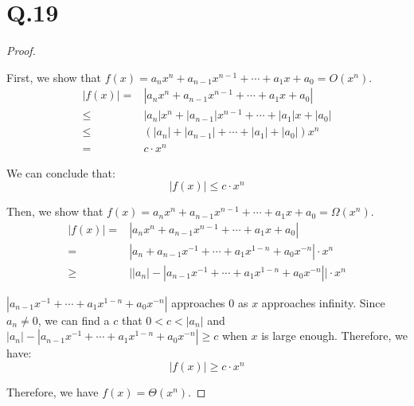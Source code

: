 \documentclass[a4paper,12pt]{article}
\begin{document}
\section*{Q.19}
\begin{proof}
$ $

First, we show that $f(x) = a_n x^n + a_{n-1} x^{n-1} + \cdots + a_1 x + a_0 = O(x^n)$.
\begin{align*}
	|f(x)| =& |a_n x^n + a_{n-1} x^{n-1} + \cdots + a_1 x + a_0|\\
	\leq& |a_n| x^n + |a_{n-1}| x^{n-1} + \cdots + |a_1| x + |a_0|\\
	\leq& (|a_n| + |a_{n-1}| + \cdots + |a_1| + |a_0|) x^n\\
	=& c \cdot x^n
\end{align*}

We can conclude that:
\begin{equation*}
	|f(x)| \leq c \cdot x^n
\end{equation*}

Then, we show that $f(x) = a_n x^n + a_{n-1} x^{n-1} + \cdots + a_1 x + a_0 = \Omega(x^n)$.
\begin{align*}
	|f(x)| =& |a_n x^n + a_{n-1} x^{n-1} + \cdots + a_1 x + a_0|\\
	=& |a_n + a_{n-1} x^{-1} + \cdots + a_1 x^{1-n} + a_0 x^{-n}| \cdot x^n\\
	\geq& \big| |a_n| - |a_{n-1} x^{-1} + \cdots + a_1 x^{1-n} + a_0 x^{-n}| \big| \cdot x^n
\end{align*}

$|a_{n-1} x^{-1} + \cdots + a_1 x^{1-n} + a_0 x^{-n}|$ approaches 0 as $x$ approaches infinity.
Since $a_n \ne 0$, we can find a $c$ that $0 < c < |a_n|$ and $|a_n| - |a_{n-1} x^{-1} + \cdots + a_1 x^{1-n} + a_0 x^{-n}| \geq c$ when $x$ is large enough.
Therefore, we have:
\begin{equation*}
	|f(x)| \geq c \cdot x^n
\end{equation*}

Therefore, we have $f(x) = \Theta(x^n)$.
\end{proof}
\end{document}
